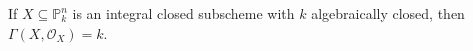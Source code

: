If $X \subseteq \mathbb{P}_k^n$ is an integral closed subscheme with $k$ algebraically
closed, then $\Gamma(X, \mathcal{O}_X) = k$.
